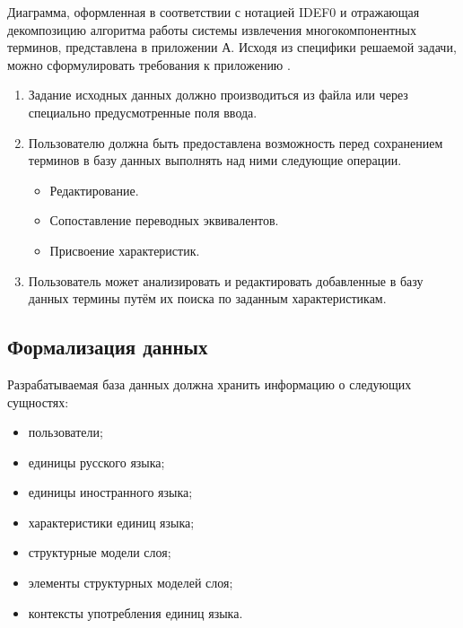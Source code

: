 Диаграмма, оформленная в соответствии с нотацией IDEF0 и отражающая декомпозицию алгоритма работы системы извлечения многокомпонентных терминов, представлена в приложении А. Исходя из специфики решаемой задачи, можно сформулировать требования к приложению \cite{My_article_2022}.


\begin{enumerate}[label*=\arabic*.]
	\item Задание исходных данных должно производиться из файла или через специально предусмотренные поля ввода.
	\item Пользователю должна быть предоставлена возможность перед сохранением терминов в базу данных выполнять над ними следующие операции.
	
	\begin{itemize}[label*=---]
		\item Редактирование.
		\item Сопоставление переводных эквивалентов.
		\item Присвоение характеристик.
		
	\end{itemize}

	\item Пользователь может анализировать и редактировать добавленные в базу данных термины путём их поиска по заданным характеристикам.
	
\end{enumerate}



\subsection{Формализация данных}

Разрабатываемая база данных должна хранить информацию о следующих сущностях:

\begin{itemize}[label*=---]
	\item пользователи;
	\item единицы русского языка;
	\item единицы иностранного языка;
	\item характеристики единиц языка;
	\item структурные модели слоя;
	\item элементы структурных моделей слоя;
	\item контексты употребления единиц языка.

\end{itemize}

